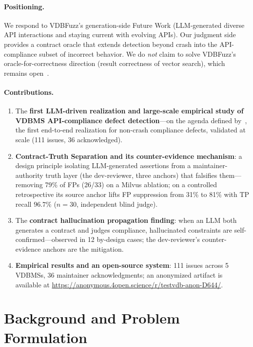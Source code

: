 \documentclass[sigconf, anonymous, review]{acmart}
\begin{document}
\paragraph{Positioning.}
We respond to VDBFuzz's generation-side Future Work (LLM-generated diverse API interactions and staying current with evolving APIs). Our judgment side provides a contract oracle that extends detection beyond crash into the API-compliance subset of incorrect behavior. We do \emph{not} claim to solve VDBFuzz's oracle-for-correctness direction (result correctness of vector search), which remains open~\cite{roadmap25}.

\paragraph{Contributions.}
\begin{enumerate}[leftmargin=*,itemsep=2pt]
\item The \textbf{first LLM-driven realization and large-scale empirical study of VDBMS API-compliance defect detection}---on the agenda defined by~\cite{roadmap25}, the first end-to-end realization for non-crash compliance defects, validated at scale (111 issues, 36 acknowledged).
\item \textbf{Contract-Truth Separation and its counter-evidence mechanism}: a design principle isolating LLM-generated assertions from a maintainer-authority truth layer (the dev-reviewer, three anchors) that falsifies them---removing 79\% of FPs (26/33) on a Milvus ablation; on a controlled retrospective its source anchor lifts FP suppression from 31\% to 81\% with TP recall $96.7\%$ ($n{=}30$, independent blind judge).
\item The \textbf{contract hallucination propagation finding}: when an LLM both generates a contract and judges compliance, hallucinated constraints are self-confirmed---observed in 12 by-design cases; the dev-reviewer's counter-evidence anchors are the mitigation.
\item \textbf{Empirical results and an open-source system}: 111 issues across 5 VDBMSs, 36 maintainer acknowledgments; an anonymized artifact is available at \url{https://anonymous.4open.science/r/testvdb-anon-D644/}.
\end{enumerate}

\section{Background and Problem Formulation}\label{sec:bg}
\end{document}
